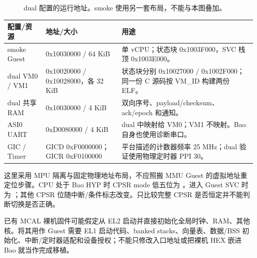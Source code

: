 \documentclass[UTF8,a4paper,11pt,oneside,fontset=none]{ctexart}
\newcommand{\code}[1]{\texttt{\detokenize{#1}}}
\begin{document}
\begin{figure}[H]\centering
{}
\caption{dual 配置的运行地址。smoke 使用另一套布局，不能与本图叠加。}
\end{figure}

\noindent\begin{tabularx}{\linewidth}{@{}P{35mm}P{47mm}Y@{}}\toprule
配置/资源 & 地址/大小 & 用途\\\midrule
smoke Guest & 0x10030000 / 64 KiB & 单 vCPU；状态块 0x1003F000，SVC 栈顶 0x1003E000。\\
dual VM0 / VM1 & 0x10020000 / 0x10028000，各 32 KiB & 状态块分别 0x10027000 / 0x1002F000；同一份 C 源码按 VM\_ID 构建两份 ELF。\\
dual 共享 RAM & 0x10030000 / 4 KiB & 双向序号、payload/checksum、ack/epoch 和通知。\\
ASI0 UART & 0xD0080000 / 4 KiB & dual 中映射给 VM0；VM1 不映射。Bao 自身也使用诊断串口。\\
GIC / Timer & GICD 0xF0000000；GICR 0xF0100000 & 平台描述的计数器频率 25 MHz；dual 验证使用物理定时器 PPI 30。\\\bottomrule
\end{tabularx}
这里采用 MPU 隔离与固定物理地址布局，不应照搬 MMU Guest 的虚拟地址重定位步骤。CPU 处于 Bao HYP 时 CPSR mode 低五位为 \code{0x1A}，进入 Guest SVC 时为 \code{0x13}；其他 CPSR 位随中断/条件标志改变。只比较完整 CPSR 是否恒定并不能判断切换是否正确。

已有 MCAL 裸机固件可能假定从 EL2 启动并直接初始化全局时钟、RAM、其他核。将其用作 Guest 需要 EL1 启动代码、banked stacks、向量表、数据/BSS 初始化、中断/定时器适配和设备授权；不能只修改入口地址或把裸机 HEX 嵌进 Bao 就当作完成移植。
\end{document}
